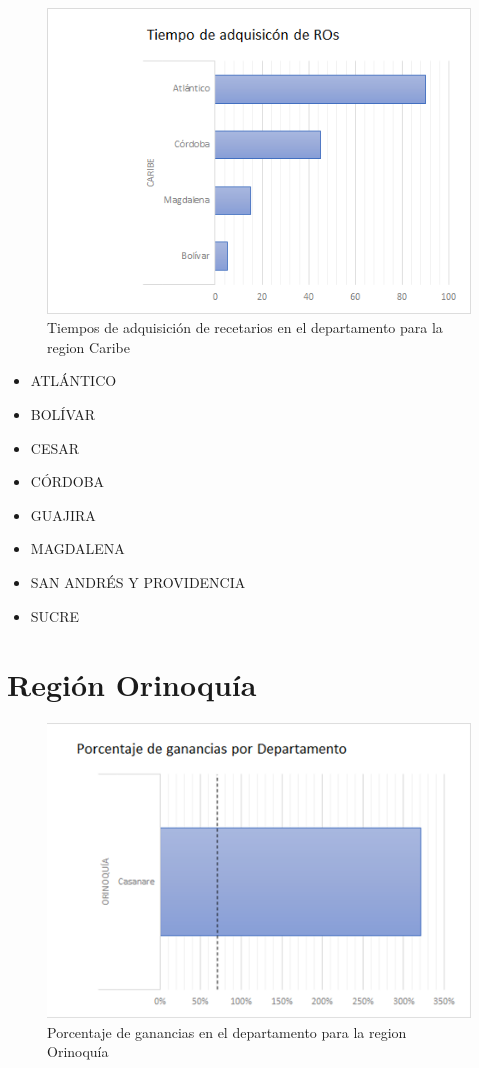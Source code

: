 \documentclass[
]{book}
\providecommand{\tightlist}{%
  \setlength{\itemsep}{0pt}\setlength{\parskip}{0pt}}
\begin{document}
\begin{figure}

{\centering \includegraphics[width=0.5\linewidth]{figures/Imagen25} 

}

\caption{Tiempos de adquisición de recetarios en el departamento para la region Caribe}\label{fig:tiemposAdquisicionRegionCaribe}
\end{figure}

\begin{itemize}
\tightlist
\item
  ATLÁNTICO
\item
  BOLÍVAR
\item
  CESAR
\item
  CÓRDOBA
\item
  GUAJIRA
\item
  MAGDALENA
\item
  SAN ANDRÉS Y PROVIDENCIA
\item
  SUCRE
\end{itemize}

\hypertarget{regiuxf3n-orinoquuxeda}{%
\section{Región Orinoquía}\label{regiuxf3n-orinoquuxeda}}

\begin{figure}

{\centering \includegraphics[width=0.5\linewidth]{figures/Imagen30} 

}

\caption{Porcentaje de ganancias en el departamento para la region Orinoquía}\label{fig:porcentajeGananciasRegionOrinoquia}
\end{figure}
\end{document}
